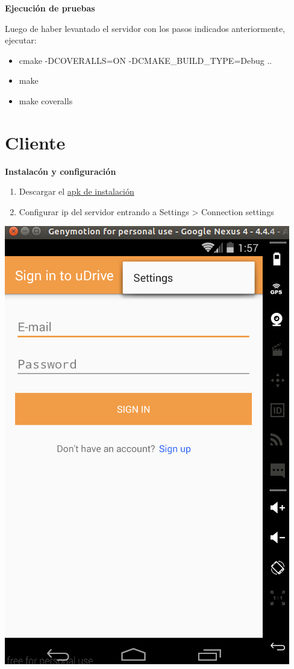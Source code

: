 \documentclass[letterpaper,10pt,english]{sphinxmanual}
\begin{document}
\textbf{Ejecución de pruebas}

Luego de haber levantado el servidor con los pasos indicados anteriormente, ejecutar:
\begin{itemize}
\item {} 
cmake -DCOVERALLS=ON -DCMAKE\_BUILD\_TYPE=Debug ..

\item {} 
make

\item {} 
make coveralls

\end{itemize}


\section{Cliente}
\label{uDriveDoc:cliente}
\textbf{Instalacón y configuración}
\begin{enumerate}
\item {} 
Descargar el \href{https://github.com/martineq/tp7552/raw/344e1550a2eab0febc324910d4edaf2256522ac9/client/src/Udrive/app/app-release.apk}{apk de instalación}

\item {} 
Configurar ip del servidor entrando a Settings \textgreater{} Connection settings

\end{enumerate}

\includegraphics{settings.png}
\end{document}
